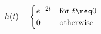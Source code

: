 \documentclass[preview]{standalone}
\begin{document}
\begin{align*}
h(t) = \begin{cases} e^{-2t} & \text{for } t \req 0 \\ 0 & \text{otherwise} \end{cases}
\end{align*}
\end{document}
